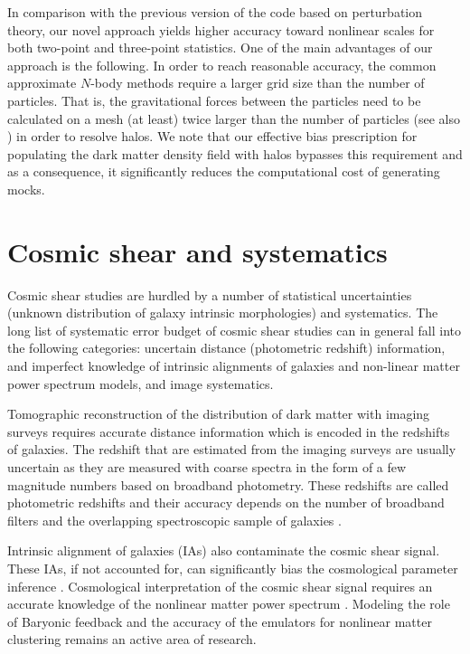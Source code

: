 In comparison with the previous version of the code based on perturbation theory, our novel approach yields higher accuracy toward nonlinear scales for both two-point 
and three-point statistics. One of the main advantages of our approach is the following. In order to reach reasonable accuracy, the common approximate $N$-body methods \citep{qpm,fastpm,ice_cola} require a larger grid size than the number of particles. That is, the gravitational forces between the particles need to be calculated on a mesh (at least) twice larger than the number of particles (see also \citealt{chuang2015,monaco2016}) in order to resolve halos. We note that our effective bias prescription for populating the dark matter density field with halos bypasses this requirement and as a consequence, it significantly reduces the computational cost of generating mocks.      

\section{Cosmic shear and systematics}

Cosmic shear studies are hurdled by a number of statistical uncertainties (unknown distribution 
of galaxy intrinsic morphologies) and systematics. The long list of systematic error budget 
of cosmic shear studies can in general fall into the following categories: uncertain distance 
(photometric redshift) information, and imperfect knowledge of intrinsic alignments of galaxies and non-linear matter 
power spectrum models, and image systematics. 

Tomographic reconstruction of the distribution of dark matter with imaging surveys requires 
accurate distance information which is encoded in the redshifts of galaxies. 
The redshift that are estimated from the imaging surveys are usually uncertain as they are measured with coarse 
spectra in the form of a few magnitude numbers based on broadband photometry. These redshifts are called 
photometric redshifts and their accuracy depends on the number of broadband filters and the overlapping spectroscopic 
sample of galaxies \citep{bonnett2016,choi2016,boris2016,hildebrandt2017}. %

Intrinsic alignment of galaxies (IAs) also contaminate the cosmic shear signal. These IAs, if not accounted for, 
can significantly bias the cosmological parameter inference \citep{codis2015,joachimi2015, kirk2015,krause_ia}. 
Cosmological interpretation of the cosmic shear signal requires an accurate knowledge of the nonlinear 
matter power spectrum \citep{semboloni2013, eifler2015, schaye2015, joudaki2016, kitching2016, mead2016}. Modeling the role of 
Baryonic feedback and the accuracy of the emulators for nonlinear matter clustering remains an active area of research. 

